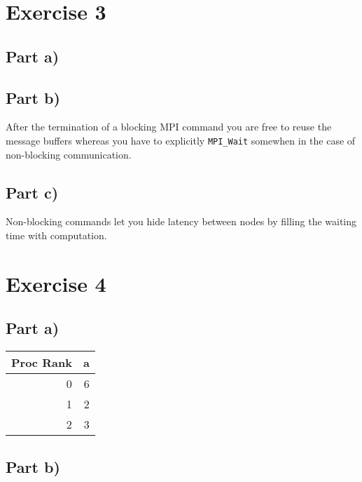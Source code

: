 \documentclass[10pt,a4paper]{article}
\begin{document}
\section*{Exercise 3}

\subsection*{Part a)}

\subsection*{Part b)}

After the termination of a blocking MPI command you are free to reuse the message buffers whereas you have to explicitly \texttt{MPI_Wait} somewhen in the case of non-blocking communication.

\subsection*{Part c)}

Non-blocking commands let you hide latency between nodes by filling the waiting time with computation.

\section*{Exercise 4}

\subsection*{Part a)}

\begin{tabular}{rr}
Proc Rank & a\\
\hline
0 & 6\\
1 & 2\\
2 & 3\\
\end{tabular}
\begin{comment}
#+ORGTBL: SEND exercise-4-a orgtbl-to-latex :splice nil :skip 0
| Proc Rank | a |
|-----------+---|
|         0 | 6 |
|         1 | 2 |
|         2 | 3 |
\end{comment}

\subsection*{Part b)}
\end{document}
